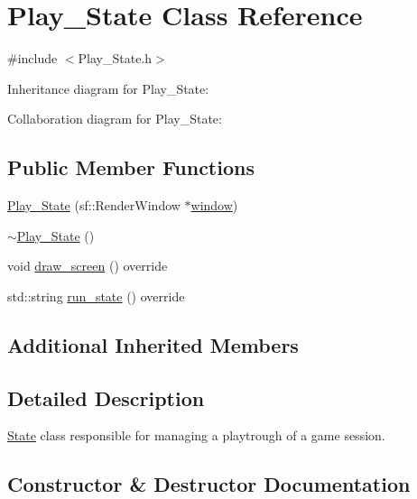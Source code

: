\hypertarget{classPlay__State}{}\section{Play\+\_\+\+State Class Reference}
\label{classPlay__State}


{\ttfamily \#include $<$Play\+\_\+\+State.\+h$>$}



Inheritance diagram for Play\+\_\+\+State\+:


Collaboration diagram for Play\+\_\+\+State\+:
\subsection*{Public Member Functions}
\begin{DoxyCompactItemize}
\item 
\hyperlink{classPlay__State_a88a04c99edb81e1086ad982e279183ab}{Play\+\_\+\+State} (sf\+::\+Render\+Window $\ast$\hyperlink{classState_ae6259a383c98ae7496266a76a9daf478}{window})
\item 
\hyperlink{classPlay__State_a681fbcf9f02496c3d021762fe4a59341}{$\sim$\+Play\+\_\+\+State} ()
\item 
void \hyperlink{classPlay__State_a77ed7569adc8ab55ef2f6645cbdc94cf}{draw\+\_\+screen} () override
\item 
std\+::string \hyperlink{classPlay__State_a209137246f75ba4bd2b5f9906d9317e6}{run\+\_\+state} () override
\end{DoxyCompactItemize}
\subsection*{Additional Inherited Members}


\subsection{Detailed Description}
\hyperlink{classState}{State} class responsible for managing a playtrough of a game session. 

\subsection{Constructor \& Destructor Documentation}
\mbox{\label{classPlay__State_a88a04c99edb81e1086ad982e279183ab}} 
